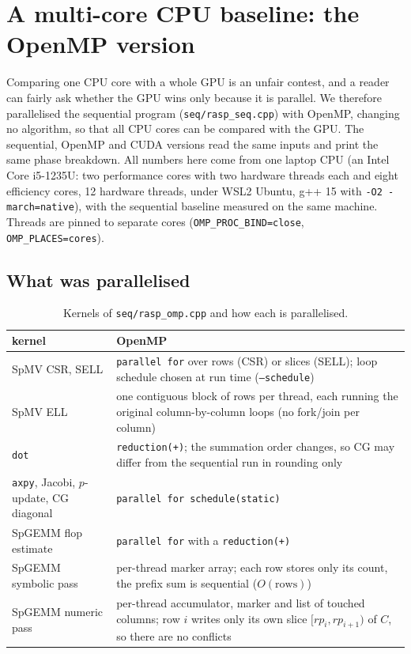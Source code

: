 \section{A multi-core CPU baseline: the OpenMP version}\label{sec:omp}

Comparing one CPU core with a whole GPU is an unfair contest, and a reader can fairly ask whether the GPU wins
only because it is parallel. We therefore parallelised the sequential program (\texttt{seq/rasp\_seq.cpp}) with OpenMP, changing no algorithm, so
that all CPU cores can be compared with the GPU. The sequential, OpenMP and CUDA versions read the same inputs and
print the same phase breakdown. All numbers here come from one laptop CPU (an Intel Core i5-1235U: two
performance cores with two hardware threads each and eight efficiency cores, 12 hardware threads, under WSL2
Ubuntu, g++ 15 with \texttt{-O2 -march=native}), with the sequential baseline measured on the same machine.
Threads are pinned to separate cores (\texttt{OMP\_PROC\_BIND=close}, \texttt{OMP\_PLACES=cores}).

\subsection{What was parallelised}
\begin{table}[t]
\centering\footnotesize
\caption{Kernels of \texttt{seq/rasp\_omp.cpp} and how each is parallelised.}\label{tab:omp-kernels}
\begin{tabular}{@{}p{2.1cm}p{5.8cm}@{}}
\toprule
kernel & OpenMP \\
\midrule
SpMV CSR, SELL & \texttt{parallel for} over rows (CSR) or slices (SELL); loop schedule chosen at run time (\texttt{--schedule}) \\
SpMV ELL & one contiguous block of rows per thread, each running the original column-by-column loops (no fork/join per column) \\
\texttt{dot} & \texttt{reduction(+)}; the summation order changes, so CG may differ from the sequential run in rounding only \\
\texttt{axpy}, Jacobi, $p$-update, CG diagonal & \texttt{parallel for schedule(static)} \\
SpGEMM flop estimate & \texttt{parallel for} with a \texttt{reduction(+)} \\
SpGEMM symbolic pass & per-thread marker array; each row stores only its count, the prefix sum is sequential ($O(\text{rows})$) \\
SpGEMM numeric pass & per-thread accumulator, marker and list of touched columns; row $i$ writes only its own slice $[rp_i, rp_{i+1})$ of $C$, so there are no conflicts \\
\bottomrule
\end{tabular}
\end{table}

